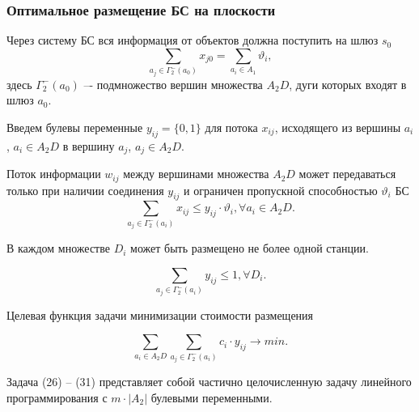 \begin{frame}
    \frametitle{Оптимальное размещение БС на плоскости}
    \fontsize{8pt}{7.2}\selectfont

    Через систему БС вся информация от объектов  должна поступить на шлюз $s_0$ 
    \begin{equation}\label{eq:part3_device2gateway_flow}
        \sum_{a_j \in \Gamma_2^-(a_0)} x_{j0} = \sum_{a_i \in A_1} \vartheta_i,
    \end{equation}
    здесь $\Gamma_2^-(a_0)$ –- подмножество вершин множества $A_2D$, дуги которых входят в шлюз $a_0$.

    Введем булевы переменные $y_{ij} = \{0,1\}$ для потока $x_{ij}$, исходящего из вершины $a_i$, $a_i \in A_2D$ в вершину $a_j$, $a_j \in A_2D$. 

    Поток информации $w_{ij}$ между вершинами множества $A_2D$ может передаваться только при наличии соединения $y_{ij}$ и ограничен пропускной способностью $\vartheta_i$ БС
    \begin{equation}\label{eq:part3_flow_link_sta}
        \sum_{a_j \in \Gamma_2^-(a_i)} x_{ij} \leqslant y_{ij} \cdot \vartheta_i, \forall a_i \in A_2D.
    \end{equation}

    В каждом множестве $D_i$ может быть размещено не более одной станции. 

    \begin{equation}\label{eq:part3_only_1_link_yij}
        \sum_{a_j \in \Gamma_2^-(a_i)} y_{ij} \leqslant 1, \forall D_i.
    \end{equation}

    Целевая функция задачи минимизации стоимости размещения 

    \begin{equation}\label{eq:part3_of_min}
        \sum_{a_i \in A_2D} \sum_{a_j \in \Gamma_2^-(a_i)}c_i \cdot y_{ij} \to min.
    \end{equation}

    Задача (26) -- (31)   представляет собой частично целочисленную задачу линейного программирования с $m \cdot |A_2|$ булевыми переменными. 

\end{frame}


